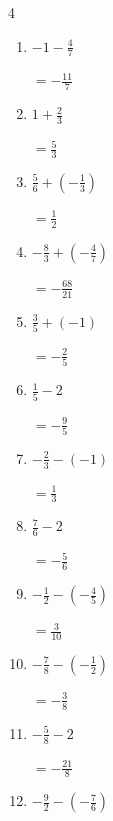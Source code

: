 \begin{multicols}{4}
\begin{enumerate}
        $\displaystyle =-\frac{41}{8}$

  \item $\displaystyle -1 - \frac{4}{7}$

        $\displaystyle =-\frac{11}{7}$

  \item $\displaystyle 1 + \frac{2}{3}$

        $\displaystyle =\frac{5}{3}$

  \item $\displaystyle \frac{5}{6} + \left(-\frac{1}{3}\right)$

        $\displaystyle =\frac{1}{2}$

  \item $\displaystyle -\frac{8}{3} + \left(-\frac{4}{7}\right)$

        $\displaystyle =-\frac{68}{21}$

  \item $\displaystyle \frac{3}{5} + \left(-1\right)$

        $\displaystyle =-\frac{2}{5}$

\columnbreak %

  \item $\displaystyle \frac{1}{5} - 2$

        $\displaystyle =-\frac{9}{5}$

  \item $\displaystyle -\frac{2}{3} - \left(-1\right)$

        $\displaystyle =\frac{1}{3}$

  \item $\displaystyle \frac{7}{6} - 2$

        $\displaystyle =-\frac{5}{6}$

  \item $\displaystyle -\frac{1}{2} - \left(-\frac{4}{5}\right)$

        $\displaystyle =\frac{3}{10}$

  \item $\displaystyle -\frac{7}{8} - \left(-\frac{1}{2}\right)$

        $\displaystyle =-\frac{3}{8}$

  \item $\displaystyle -\frac{5}{8} - 2$

        $\displaystyle =-\frac{21}{8}$

  \item $\displaystyle -\frac{9}{2} - \left(-\frac{7}{6}\right)$


\end{enumerate}
\end{multicols}
